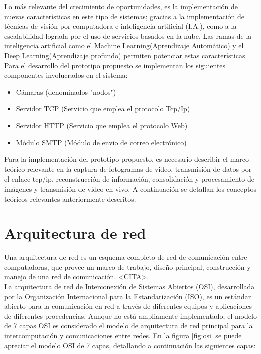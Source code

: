 Lo más relevante del crecimiento de oportunidades, es la implementación de nuevas características en este tipo de sistemas; gracias a la implementación de técnicas de visión por computadora e inteligencia artificial (I.A.), como a la escalabilidad lograda por el uso de servicios basados en la nube. Las ramas de la inteligencia artificial como el Machine Learning(Aprendizaje Automático) y el Deep Learning(Aprendizaje profundo) permiten potenciar estas características.\\

Para el desarrollo del prototipo propuesto se implementan los siguientes componentes involucrados en el sistema:
\begin{itemize}
    \item Cámaras (denominados "nodos")
    \item Servidor TCP (Servicio que emplea el protocolo Tcp/Ip)
    \item Servidor HTTP (Servicio que emplea el protocolo Web)
    \item Módulo SMTP (Módulo de envio de correo electrónico)
\end{itemize}

Para la implementación del prototipo propuesto, es necesario describir el marco teórico relevante en la captura de fotogramas de video, transmisión de datos por el enlace tcp/ip, reconstrucción de información, consolidación y procesamiento de imágenes y transmisión de video en vivo. A continuación se detallan los conceptos teóricos relevantes anteriormente descritos.\\

\section{Arquitectura de red}
Una arquitectura de red es un esquema completo de red de comunicación entre computadoras, que provee un marco de trabajo, diseño principal, construcción y manejo de una red de comunicación. <CITA>.\\

La arquitectura de red de Interconexión de Sistemas Abiertos (OSI), desarrollada por la Organización Internacional para la Estandarización (ISO), es un estándar abierto para la comunicación en red a través de diferentes equipos y aplicaciones de diferentes procedencias. Aunque no está ampliamente implementado, el modelo de 7 capas OSI es considerado el modelo de arquitectura de red principal para la intercomputación y comunicaciones entre redes. En la figura \ref{fig:osi} se puede apreciar el modelo OSI de 7 capas, detallando a continuación las siguientes capas:

